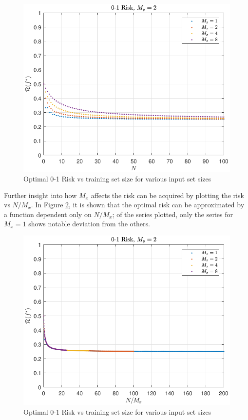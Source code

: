 \documentclass[12pt]{report}
\begin{document}
\begin{figure}
\centering
\includegraphics[width=0.8\linewidth]{Risk_01_IO_N.pdf}
\caption{Optimal 0-1 Risk vs training set size for various input set sizes}
\label{fig:Risk_01_IO_N}
\end{figure}

Further insight into how $M_x$ affects the risk can be acquired by plotting the risk vs $N/M_x$. In Figure \ref{fig:Risk_01_IO_N-Mx}, it is shown that the optimal risk can be approximated by a function dependent only on $N/M_x$; of the series plotted, only the series for $M_x = 1$ shows notable deviation from the others.

\begin{figure}
\centering
\includegraphics[width=0.8\linewidth]{Risk_01_IO_N-Mx.pdf}
\caption{Optimal 0-1 Risk vs training set size for various input set sizes}
\label{fig:Risk_01_IO_N-Mx}
\end{figure}
\end{document}
